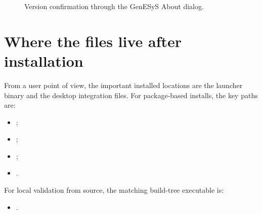 \begin{figure}[htbp]
    \centering



    \caption{Version confirmation through the GenESyS About dialog.}
    \label{fig:user-version-confirmation}
\end{figure}

\section{Where the files live after installation}
\label{sec:user-installation-file-locations}

From a user point of view, the important installed locations are the launcher
binary and the desktop integration files. For package-based installs, the key
paths are:
\begin{itemize}
\item {};
\item {};
\item {};
\item {}.
\end{itemize}

For local validation from source, the matching build-tree executable is:
\begin{itemize}
\item {}.
\end{itemize}

